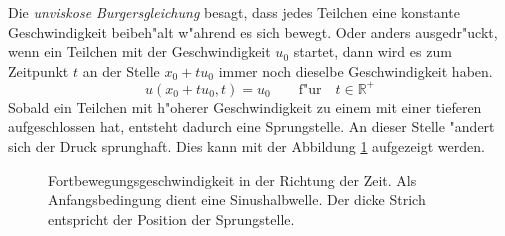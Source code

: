 \begin{refsection}
Die \textit{unviskose Burgersgleichung} besagt, dass jedes Teilchen
eine konstante Geschwindigkeit beibeh"alt w"ahrend es sich bewegt. Oder
anders ausgedr"uckt, wenn ein Teilchen mit der Geschwindigkeit $u_{0}$
startet, dann wird es zum Zeitpunkt $t$ an der Stelle $x_{0}\!+\!tu_{0}$
immer noch dieselbe Geschwindigkeit haben.
\begin{equation}
u(x_{0}\!+\!tu_{0},t) = u_{0} \qquad \text{f"ur} \quad t \in \mathbb{R^{+}} 
\end{equation} 
Sobald ein Teilchen mit h"oherer Geschwindigkeit zu einem mit einer
tieferen aufgeschlossen hat, entsteht dadurch eine Sprungstelle. An
dieser Stelle "andert sich der Druck sprunghaft. Dies kann mit der
Abbildung \ref{stosswellen:speed} aufgezeigt werden.
\begin{figure}
\begin{center}
\end{center}
\caption{Fortbewegungsgeschwindigkeit in der Richtung der Zeit. Als
Anfangsbedingung dient eine Sinushalbwelle. Der dicke Strich entspricht
der Position der Sprungstelle.\cite{stoss:sinusAnfang} 
\label{stosswellen:speed}}
\end{figure}


\end{refsection}
